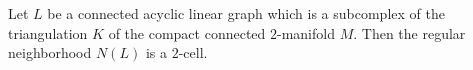 Let $L$ be a connected acyclic linear graph which is a subcomplex of the triangulation $K$ of the compact connected $2$-manifold $M$. Then the regular neighborhood $N(L)$ is a $2$-cell.
